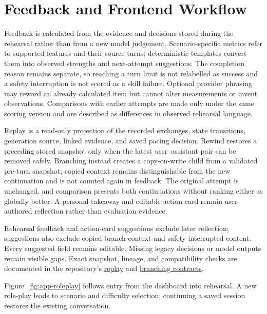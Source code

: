 \section{Feedback and Frontend Workflow}
\label{sec:feedback-reflection}
\label{sec:frontend-application}

Feedback is calculated from the evidence and decisions stored during the rehearsal rather than from a new model judgement. Scenario-specific metrics refer to supported features and their source turns; deterministic templates convert them into observed strengths and next-attempt suggestions. The completion reason remains separate, so reaching a turn limit is not relabelled as success and a safety interruption is not scored as a skill failure. Optional provider phrasing may reword an already calculated item but cannot alter measurements or invent observations. Comparisons with earlier attempts are made only under the same scoring version and are described as differences in observed rehearsal language.
\label{subsec:evidence-feedback}

Replay is a read-only projection of the recorded exchanges, state transitions, generation source, linked evidence, and saved pacing decision. Rewind restores a preceding stored snapshot only when the latest user--assistant pair can be removed safely. Branching instead creates a copy-on-write child from a validated pre-turn snapshot; copied context remains distinguishable from the new continuation and is not counted again in feedback. The original attempt is unchanged, and comparison presents both continuations without ranking either as globally better. A personal takeaway and editable action card remain user-authored reflection rather than evaluation evidence.
\label{subsec:conversation-replay}
\label{subsec:rewind-branching}
\label{subsec:takeaways-action-cards}

Rehearsal feedback and action-card suggestions exclude later reflection; suggestions also exclude copied branch context and safety-interrupted content. Every suggested field remains editable. Missing legacy decisions or model outputs remain visible gaps. Exact snapshot, lineage, and compatibility checks are documented in the repository's \href{https://github.com/ralucabiras/emotion-aware-role-play-model/blob/main/docs/conversation-replay.md}{replay} and \href{https://github.com/ralucabiras/emotion-aware-role-play-model/blob/main/docs/branch-and-compare.md}{branching contracts}.

Figure~\ref{fig:app-roleplay} follows entry from the dashboard into rehearsal. A new role-play leads to scenario and difficulty selection; continuing a saved session restores the existing conversation.
\label{subsec:frontend-navigation}

